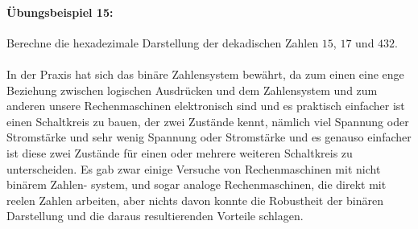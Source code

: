 \documentclass[11pt,a4paper,leqno]{report}
\numberwithin{equation}{chapter}
\begin{document}
\paragraph{Übungsbeispiel 15:} Berechne die hexadezimale Darstellung der dekadischen Zahlen $15$, $17$ und $432$.\\
\\
In der Praxis hat sich das binäre Zahlensystem bewährt, da zum einen eine enge Beziehung zwischen logischen Ausdrücken und dem Zahlensystem und zum anderen unsere Rechenmaschinen elektronisch sind und es praktisch einfacher ist einen Schaltkreis zu bauen, der zwei Zustände kennt, nämlich viel Spannung oder Stromstärke und sehr wenig Spannung oder Stromstärke und es genauso einfacher ist diese zwei Zustände für einen oder mehrere weiteren Schaltkreis zu unterscheiden. Es gab zwar einige Versuche von Rechenmaschinen mit nicht binärem Zahlen- system, und sogar analoge Rechenmaschinen, die direkt mit reelen Zahlen arbeiten, aber nichts davon konnte die Robustheit der binären Darstellung und die daraus resultierenden Vorteile schlagen.


\newpage
\end{document}

